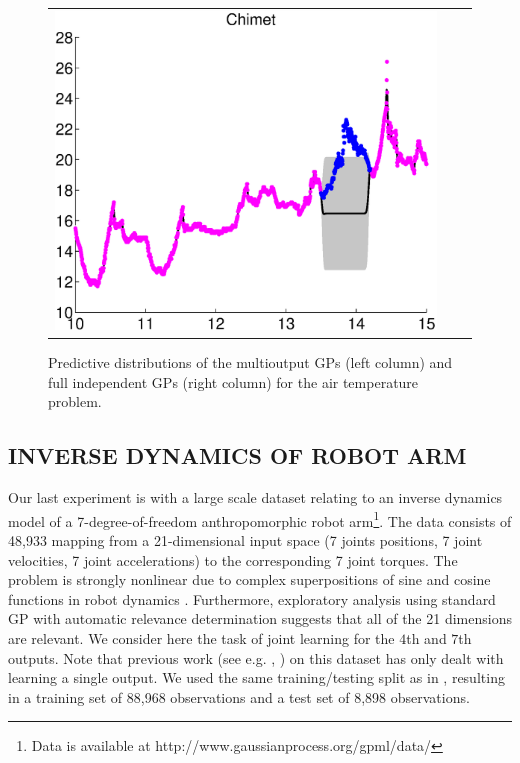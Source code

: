 \begin{figure}
\begin{tabular}{ccc}
\includegraphics[scale=0.3]{figures/weatherChimet.eps}
\end{tabular}
\caption{Predictive distributions of the multioutput GPs (left column) and full independent GPs (right column) for the air temperature problem.}
\label{fig:weather}
\end{figure}

\subsection{INVERSE DYNAMICS OF ROBOT ARM}
Our last experiment is with a large scale dataset relating to an inverse dynamics model of a 7-degree-of-freedom anthropomorphic robot arm\footnote{Data is available at http://www.gaussianprocess.org/gpml/data/}.
The data consists of 48,933 mapping from a 21-dimensional input space (7 joints positions, 7 joint velocities, 7 joint accelerations) to the corresponding 7 joint torques.
The problem is strongly nonlinear due to complex superpositions of sine and cosine functions in robot dynamics \citet{vijayakumar2000locally}.
Furthermore, exploratory analysis using standard GP with automatic relevance determination suggests that all of the 21 dimensions are relevant.
We consider here the task of joint learning for the $4$th and $7$th outputs.
Note that previous work (see e.g. \citet{rasmussen-williams-book},  \citet{vijayakumar2000locally}) on this dataset has only dealt with learning  a single output.
We used the same training/testing split as in \citet{rasmussen-williams-book}, resulting in a training set of 88,968 observations and a test set of 
8,898 observations.

